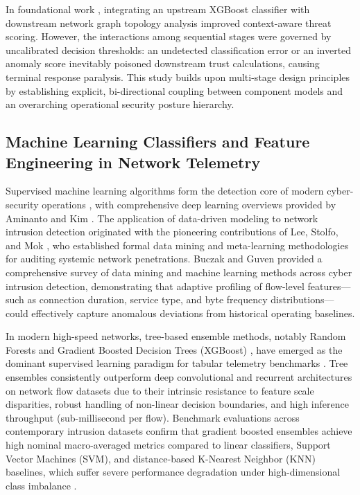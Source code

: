 \documentclass[journal,10pt,onecolumn]{IEEEtran}
\begin{document}
In foundational work \cite{1}, integrating an upstream XGBoost classifier with downstream network graph topology analysis improved context-aware threat scoring. However, the interactions among sequential stages were governed by uncalibrated decision thresholds: an undetected classification error or an inverted anomaly score inevitably poisoned downstream trust calculations, causing terminal response paralysis. This study builds upon multi-stage design principles by establishing explicit, bi-directional coupling between component models and an overarching operational security posture hierarchy.


\subsection{Machine Learning Classifiers and Feature Engineering in Network Telemetry}
Supervised machine learning algorithms form the detection core of modern cyber-security operations \cite{17, 22}, with comprehensive deep learning overviews provided by Aminanto and Kim \cite{24}. The application of data-driven modeling to network intrusion detection originated with the pioneering contributions of Lee, Stolfo, and Mok \cite{33}, who established formal data mining and meta-learning methodologies for auditing systemic network penetrations. Buczak and Guven \cite{17} provided a comprehensive survey of data mining and machine learning methods across cyber intrusion detection, demonstrating that adaptive profiling of flow-level features—such as connection duration, service type, and byte frequency distributions—could effectively capture anomalous deviations from historical operating baselines.

In modern high-speed networks, tree-based ensemble methods, notably Random Forests and Gradient Boosted Decision Trees (XGBoost) \cite{8}, have emerged as the dominant supervised learning paradigm for tabular telemetry benchmarks \cite{17}. Tree ensembles consistently outperform deep convolutional and recurrent architectures on network flow datasets due to their intrinsic resistance to feature scale disparities, robust handling of non-linear decision boundaries, and high inference throughput (sub-millisecond per flow). Benchmark evaluations across contemporary intrusion datasets confirm that gradient boosted ensembles achieve high nominal macro-averaged metrics compared to linear classifiers, Support Vector Machines (SVM), and distance-based K-Nearest Neighbor (KNN) baselines, which suffer severe performance degradation under high-dimensional class imbalance \cite{17}.
\end{document}
